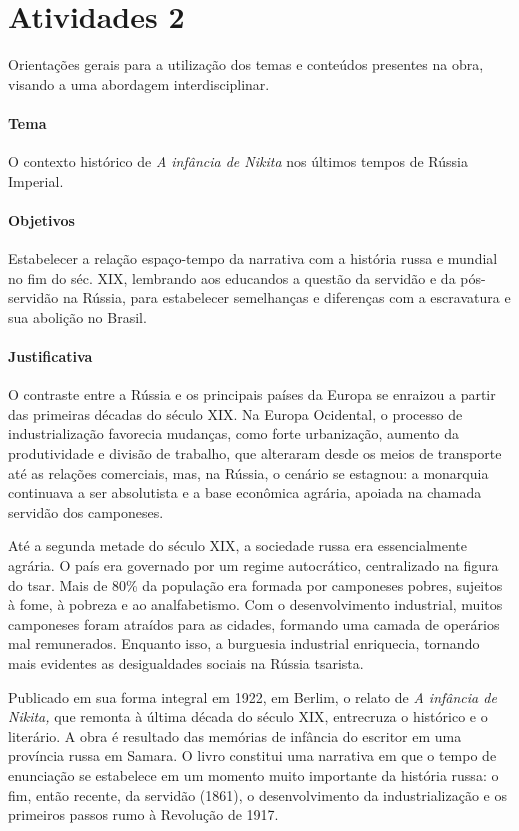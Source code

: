 \documentclass{article}
\begin{document}
\section{Atividades 2}

Orientações gerais para a utilização dos temas e conteúdos
presentes na obra, visando a uma abordagem interdisciplinar.

\paragraph{Tema} O contexto histórico de \emph{A infância de Nikita} nos últimos tempos de Rússia Imperial.


\paragraph{Objetivos}
Estabelecer a relação espaço-tempo da narrativa com a história russa e
mundial no fim do séc. XIX, lembrando aos educandos a questão da
servidão e da pós-servidão na Rússia, para estabelecer semelhanças e
diferenças com a escravatura e sua abolição no Brasil.

\paragraph{Justificativa}
O contraste entre a Rússia e os principais países da Europa se enraizou
a partir das primeiras décadas do século XIX. Na Europa Ocidental, o
processo de industrialização favorecia mudanças, como forte urbanização,
aumento da produtividade e divisão de trabalho, que alteraram desde os
meios de transporte até as relações comerciais, mas, na Rússia, o
cenário se estagnou: a monarquia continuava a ser absolutista e a base
econômica agrária, apoiada na chamada servidão dos camponeses.

Até a segunda metade do século XIX, a sociedade russa era essencialmente
agrária. O país era governado por um regime autocrático, centralizado na
figura do tsar. Mais de 80\% da população era formada por camponeses
pobres, sujeitos à fome, à pobreza e ao analfabetismo. Com o
desenvolvimento industrial, muitos camponeses foram atraídos para as
cidades, formando uma camada de operários mal remunerados. Enquanto
isso, a burguesia industrial enriquecia, tornando mais evidentes as
desigualdades sociais na Rússia tsarista.

Publicado em sua forma integral em 1922, em Berlim, o relato de \emph{A
infância de Nikita,} que remonta à última década do século XIX,
entrecruza o histórico e o literário. A obra é resultado das memórias de
infância do escritor em uma província russa em Samara. O livro constitui
uma narrativa em que o tempo de enunciação se estabelece em um momento
muito importante da história russa: o fim, então recente, da servidão
(1861), o desenvolvimento da industrialização e os primeiros passos rumo
à Revolução de 1917.
\end{document}
